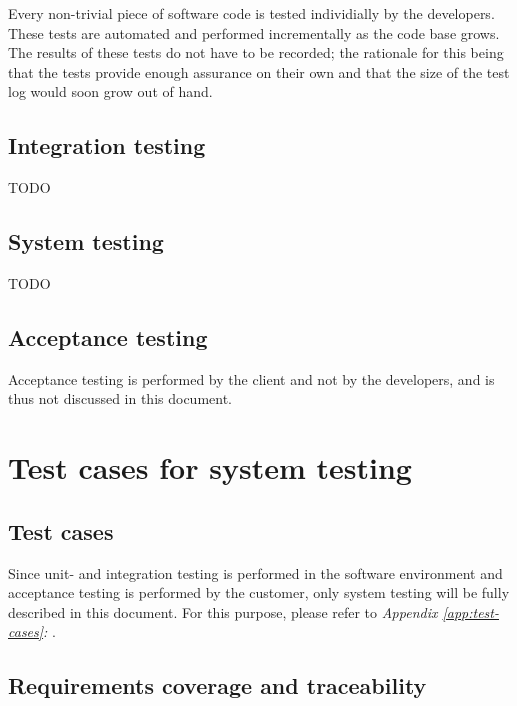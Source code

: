 \documentclass[12pt,titlepage,bibliography=totoc]{article}
\begin{document}
Every non-trivial piece of software code is tested individially by the
developers. These tests are automated and performed incrementally as the
code base grows. The results of these tests do not have to be recorded; the
rationale for this being that the tests provide enough assurance on their own
and that the size of the test log would soon grow out of hand.

\subsection{Integration testing}
\label{subsec:test-recording-procedure-integration-testing}

TODO

\subsection{System testing}
\label{subsec:test-recording-procedure-system-testing}

TODO

\subsection{Acceptance testing}
\label{subsec:test-recording-procedure-acceptance-testing}

Acceptance testing is performed by the client and not by the developers, and is
thus not discussed in this document.



\section{Test cases for system testing}
\label{sec:test-cases-for-system-testing}

\subsection{Test cases}
\label{subsec:test-cases}

Since unit- and integration testing is performed in the software environment and
acceptance testing is performed by the customer, only system testing will be
fully described in this document. For this purpose, please refer to
\textit{Appendix \ref{app:test-cases}: }.

\subsection{Requirements coverage and traceability}
\label{subsec:requirements-coverage-and-testability}
\end{document}
